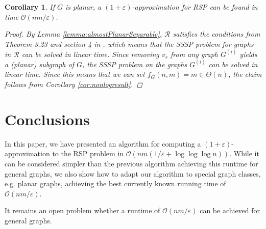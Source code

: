 \documentclass[a4paper, 10pt, oneside]{article}
\theoremstyle{plain}
\newtheorem{corollary}[theorem]{Corollary}
\theoremstyle{definition}
\numberwithin{equation}{section}
\newcommand{\calO}{\mathcal{O}}
\newcommand{\calR}{\mathcal{R}}
\newcommand{\compLeq}[1]{\calO\left( #1 \right)}
\providecommand{\rowtime}[1]{f_{#1}}
\begin{document}
\begin{corollary} \label{cor:planarGraphRuntime}
If $G$ is planar, a $(1 + \varepsilon)$-approximation for RSP can be found in time $\compLeq{nm/\varepsilon}$.

\begin{proof}
By Lemma \ref{lemma:almostPlanarSeparable}, $\calR$ satisfies the conditions from Theorem 3.23 and section 4 in \cite{henzinger1997}, which means that the SSSP problem for graphs in $\calR$ can be solved in linear time. Since removing $v_s$ from any graph $G^{(i)}$ yields a (planar) subgraph of $G$, the SSSP problem on the graphs $G^{(i)}$ can be solved in linear time. Since this means that we can set $\rowtime{G}(n, m) = m \in \Theta(n)$, the claim follows from Corollary \ref{cor:nonlogresult}.
\end{proof}
\end{corollary}

\section{Conclusions}

In this paper, we have presented an algorithm for computing a $(1 + \varepsilon)$-approximation to the RSP problem in $\compLeq{nm\left(1/\varepsilon + \log \log \log n\right)}$. While it can be considered simpler than the previous algorithm achieving this runtime for general graphs, we also show how to adapt our algorithm to special graph classes, e.g. planar graphs, achieving the best currently known running time of $\compLeq{nm/\varepsilon}$.

It remains an open problem whether a runtime of $\compLeq{nm/\varepsilon}$ can be achieved for general graphs.



%
\nocite{*}




\end{document}
